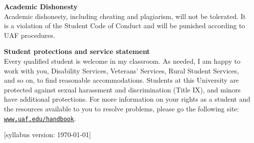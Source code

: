 \documentclass[12pt]{article}
\renewcommand{\emph}[1]{\textsf{\textbf{#1}}}
\newcommand{\localhead}[1]{\par\smallskip\textbf{#1} \smallskip\nobreak\\}%
\def\subheading#1{\localhead{\emph{#1}}}
\begin{document}
\subheading{Academic Dishonesty}
Academic dishonesty, including cheating and plagiarism, will not be tolerated.  It is a violation of the Student Code of Conduct and will be punished according to UAF procedures.

\subheading{Student protections and service statement}
Every qualified student is welcome in my classroom.  As needed, I am happy to work with you, Disability Services, Veterans' Services, Rural Student Services, and so on, to find reasonable accommodations.  Students at this University are protected against sexual harassment and discrimination (Title IX), and minors have additional protections.  For more information on your rights as a student and the resources available to you to resolve problems, please go the following site: \href{https://www.uaf.edu/handbook/}{\texttt{www.uaf.edu/handbook}}.

\hfill  \scriptsize [syllabus version: \today] \normalsize
\end{document}
